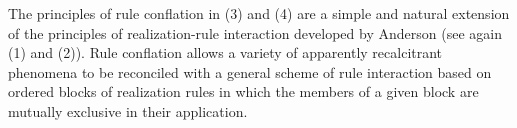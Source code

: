\documentclass[output=paper,
modfonts
]{LSP/langsci}
\begin{document}
The principles of rule conflation in (3) and (4) are a simple and natural extension of the principles of realization-rule interaction developed by Anderson (see again (1) and (2)).  Rule conflation allows a variety of apparently recalcitrant phenomena to be reconciled with a general scheme of rule interaction based on ordered blocks of realization rules in which the members of a given block are mutually exclusive in their application.  



\printbibliography[heading=subbibliography,notkeyword=this]
\end{document}
